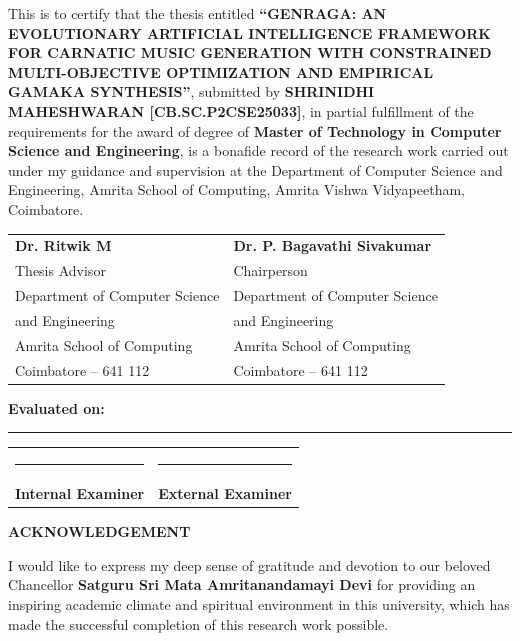 \documentclass[12pt,a4paper]{report}
\begin{document}
This is to certify that the thesis entitled \textbf{``GENRAGA: AN EVOLUTIONARY ARTIFICIAL INTELLIGENCE FRAMEWORK FOR CARNATIC MUSIC GENERATION WITH CONSTRAINED MULTI-OBJECTIVE OPTIMIZATION AND EMPIRICAL GAMAKA SYNTHESIS''}, submitted by \textbf{SHRINIDHI MAHESHWARAN [CB.SC.P2CSE25033]}, in partial fulfillment of the requirements for the award of degree of \textbf{Master of Technology in Computer Science and Engineering}, is a bonafide record of the research work carried out under my guidance and supervision at the Department of Computer Science and Engineering, Amrita School of Computing, Amrita Vishwa Vidyapeetham, Coimbatore.

\vspace{3.5cm}
\noindent
\begin{tabular}{@{}p{}p{}@{}}
\textbf{Dr. Ritwik M} & \textbf{Dr. P. Bagavathi Sivakumar} \\
Thesis Advisor & Chairperson \\
Department of Computer Science & Department of Computer Science \\
and Engineering & and Engineering \\
Amrita School of Computing & Amrita School of Computing \\
Coimbatore -- 641 112 & Coimbatore -- 641 112 \\
\end{tabular}

\vspace{2.5cm}
\noindent
\textbf{Evaluated on:} \rule{4cm}{0.4pt}

\vspace{1.5cm}
\noindent
\begin{tabular}{@{}p{}p{}@{}}
\rule{5cm}{0.4pt} & \rule{5cm}{0.4pt} \\
\textbf{Internal Examiner} & \textbf{External Examiner} \\
\end{tabular}

\newpage
{}
\setcounter{page}{3}
\begin{center}
{\Large \bfseries ACKNOWLEDGEMENT \par}
\end{center}
\vspace{0.8cm}

I would like to express my deep sense of gratitude and devotion to our beloved Chancellor \textbf{Satguru Sri Mata Amritanandamayi Devi} for providing an inspiring academic climate and spiritual environment in this university, which has made the successful completion of this research work possible.
\end{document}

